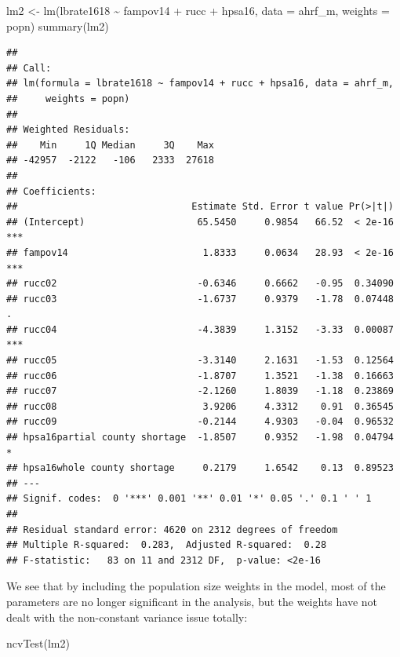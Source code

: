 \documentclass[
]{article}
\newenvironment{Shaded}{\begin{snugshade}}{\end{snugshade}}
\newcommand{\AttributeTok}[1]{\textcolor[rgb]{0.77,0.63,0.00}{#1}}
\newcommand{\FunctionTok}[1]{\textcolor[rgb]{0.00,0.00,0.00}{#1}}
\newcommand{\NormalTok}[1]{#1}
\newcommand{\OtherTok}[1]{\textcolor[rgb]{0.56,0.35,0.01}{#1}}
\newcommand{\SpecialCharTok}[1]{\textcolor[rgb]{0.00,0.00,0.00}{#1}}
\begin{document}
\begin{Shaded}
\begin{Highlighting}[]
\NormalTok{lm2 }\OtherTok{\textless{}{-}} \FunctionTok{lm}\NormalTok{(lbrate1618 }\SpecialCharTok{\textasciitilde{}}\NormalTok{  fampov14 }\SpecialCharTok{+}\NormalTok{ rucc }\SpecialCharTok{+}\NormalTok{ hpsa16,}
          \AttributeTok{data =}\NormalTok{ ahrf\_m,}
          \AttributeTok{weights =}\NormalTok{ popn)}
\FunctionTok{summary}\NormalTok{(lm2)}
\end{Highlighting}
\end{Shaded}

\begin{verbatim}
## 
## Call:
## lm(formula = lbrate1618 ~ fampov14 + rucc + hpsa16, data = ahrf_m, 
##     weights = popn)
## 
## Weighted Residuals:
##    Min     1Q Median     3Q    Max 
## -42957  -2122   -106   2333  27618 
## 
## Coefficients:
##                               Estimate Std. Error t value Pr(>|t|)    
## (Intercept)                    65.5450     0.9854   66.52  < 2e-16 ***
## fampov14                        1.8333     0.0634   28.93  < 2e-16 ***
## rucc02                         -0.6346     0.6662   -0.95  0.34090    
## rucc03                         -1.6737     0.9379   -1.78  0.07448 .  
## rucc04                         -4.3839     1.3152   -3.33  0.00087 ***
## rucc05                         -3.3140     2.1631   -1.53  0.12564    
## rucc06                         -1.8707     1.3521   -1.38  0.16663    
## rucc07                         -2.1260     1.8039   -1.18  0.23869    
## rucc08                          3.9206     4.3312    0.91  0.36545    
## rucc09                         -0.2144     4.9303   -0.04  0.96532    
## hpsa16partial county shortage  -1.8507     0.9352   -1.98  0.04794 *  
## hpsa16whole county shortage     0.2179     1.6542    0.13  0.89523    
## ---
## Signif. codes:  0 '***' 0.001 '**' 0.01 '*' 0.05 '.' 0.1 ' ' 1
## 
## Residual standard error: 4620 on 2312 degrees of freedom
## Multiple R-squared:  0.283,  Adjusted R-squared:  0.28 
## F-statistic:   83 on 11 and 2312 DF,  p-value: <2e-16
\end{verbatim}

We see that by including the population size weights in the model, most of the parameters are no longer significant in the analysis, but the weights have not dealt with the non-constant variance issue totally:

\begin{Shaded}
\begin{Highlighting}[]
\FunctionTok{ncvTest}\NormalTok{(lm2)}
\end{Highlighting}
\end{Shaded}
\end{document}

